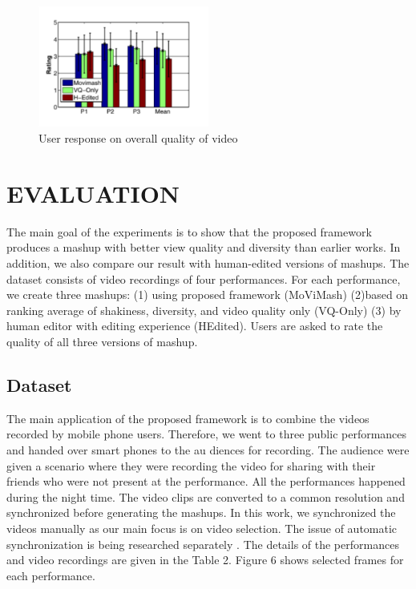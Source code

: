 \documentclass{sig-alternate}
\begin{document}
\begin{figure}[h]
    \centering
    \includegraphics[width=0.5\textwidth]{img8.png}
    \caption{User response on overall quality of video}
    \label{fig:mesh8}
\end{figure}

    \section{EVALUATION}
    The main goal of the experiments is to show that the proposed framework produces a mashup with better view quality and diversity than earlier works. In addition, we also compare our result with human-edited versions of mashups. The dataset consists of video recordings of four performances. For each performance, we create three mashups: (1) using proposed framework (MoViMash) (2)based on ranking average of shakiness, diversity, and video quality
    only (VQ-Only) (3) by human editor with editing experience (HEdited). Users are asked to rate the quality of all three versions of mashup.
    \subsection{Dataset}
    The main application of the proposed framework is to combine the videos recorded by mobile phone users. Therefore, we went to three public performances and handed over smart phones to the au diences for recording. The audience were given a scenario where they were recording the video for sharing with their friends who were not present at the performance. All the performances happened during the night time. The video clips are converted to a common resolution and synchronized before generating the mashups. In this work, we synchronized the videos manually as our main focus is on video selection. The issue of automatic synchronization is being researched separately \cite{14}. The details of the performances and video recordings are given in the Table 2. Figure 6 shows selected frames for each performance.
\end{document}
